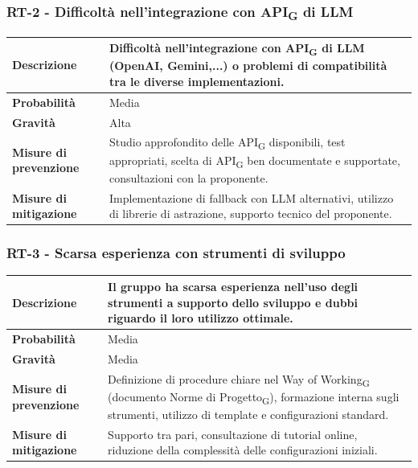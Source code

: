 \documentclass[11pt,a4paper]{article}
\newcommand{\gls}[1]{#1\textsubscript{G}}
\begin{document}
\subsubsection{RT-2 - Difficoltà nell'integrazione con \gls{API} di LLM}
\begin{center}
\begin{tabular}{|p{3cm}|p{12cm}|}
    \hline
    \textbf{Descrizione} & Difficoltà nell'integrazione con \gls{API} di LLM (OpenAI, Gemini,...) o problemi di compatibilità tra le diverse implementazioni. \\
    \hline
    \textbf{Probabilità} & Media \\
    \hline
    \textbf{Gravità} & Alta \\
    \hline
    \textbf{Misure di prevenzione} & Studio approfondito delle \gls{API} disponibili, test appropriati, scelta di \gls{API} ben documentate e supportate, consultazioni con la proponente. \\
    \hline
    \textbf{Misure di mitigazione} & Implementazione di fallback con LLM alternativi, utilizzo di librerie di astrazione, supporto tecnico del proponente. \\
    \hline
\end{tabular}
\end{center}

\subsubsection{RT-3 - Scarsa esperienza con strumenti di sviluppo}
\begin{center}
\begin{tabular}{|p{3cm}|p{12cm}|}
    \hline
    \textbf{Descrizione} & Il gruppo ha scarsa esperienza nell'uso degli strumenti a supporto dello sviluppo e dubbi riguardo il loro utilizzo ottimale. \\
    \hline
    \textbf{Probabilità} & Media \\
    \hline
    \textbf{Gravità} & Media \\
    \hline
    \textbf{Misure di prevenzione} & Definizione di procedure chiare nel \gls{Way of Working} (documento \gls{Norme di Progetto}), formazione interna sugli strumenti, utilizzo di template e configurazioni standard. \\
    \hline
    \textbf{Misure di mitigazione} & Supporto tra pari, consultazione di tutorial online, riduzione della complessità delle configurazioni iniziali. \\
    \hline
\end{tabular}
\end{center}
\end{document}
